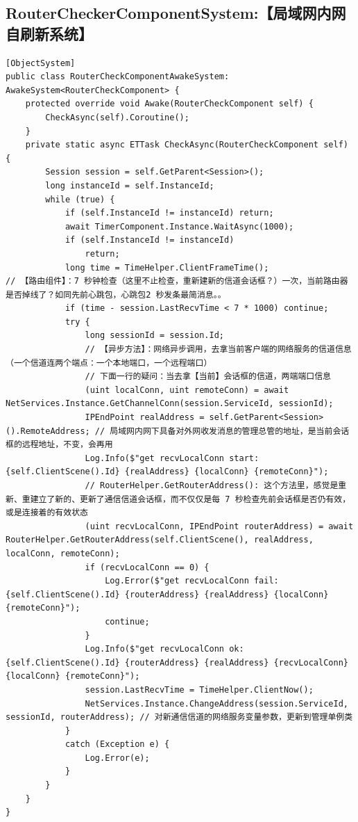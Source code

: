 \documentclass[9pt, b5paper]{article}
\begin{document}
\subsection{RouterCheckerComponentSystem:【局域网内网自刷新系统】}
\label{sec-7-19}
\begin{verbatim}
[ObjectSystem]
public class RouterCheckComponentAwakeSystem: AwakeSystem<RouterCheckComponent> {
    protected override void Awake(RouterCheckComponent self) {
        CheckAsync(self).Coroutine();
    }
    private static async ETTask CheckAsync(RouterCheckComponent self) {
        Session session = self.GetParent<Session>();
        long instanceId = self.InstanceId;
        while (true) {
            if (self.InstanceId != instanceId) return;
            await TimerComponent.Instance.WaitAsync(1000);
            if (self.InstanceId != instanceId) 
                return;
            long time = TimeHelper.ClientFrameTime();
// 【路由组件】：7 秒钟检查（这里不止检查，重新建新的信道会话框？）一次，当前路由器是否掉线了？如同先前心跳包，心跳包2 秒发条最简消息。。
            if (time - session.LastRecvTime < 7 * 1000) continue;
            try {
                long sessionId = session.Id;
                // 【异步方法】：网络异步调用，去拿当前客户端的网络服务的信道信息（一个信道连两个端点：一个本地端口，一个远程端口）
                // 下面一行的疑问：当去拿【当前】会话框的信道，两端端口信息
                (uint localConn, uint remoteConn) = await NetServices.Instance.GetChannelConn(session.ServiceId, sessionId);
                IPEndPoint realAddress = self.GetParent<Session>().RemoteAddress; // 局域网内网下具备对外网收发消息的管理总管的地址，是当前会话框的远程地址，不变，会再用
                Log.Info($"get recvLocalConn start: {self.ClientScene().Id} {realAddress} {localConn} {remoteConn}");
                // RouterHelper.GetRouterAddress(): 这个方法里，感觉是重新、重建立了新的、更新了通信信道会话框，而不仅仅是每 7 秒检查先前会话框是否仍有效，或是连接着的有效状态 
                (uint recvLocalConn, IPEndPoint routerAddress) = await RouterHelper.GetRouterAddress(self.ClientScene(), realAddress, localConn, remoteConn);
                if (recvLocalConn == 0) {
                    Log.Error($"get recvLocalConn fail: {self.ClientScene().Id} {routerAddress} {realAddress} {localConn} {remoteConn}");
                    continue;
                }
                Log.Info($"get recvLocalConn ok: {self.ClientScene().Id} {routerAddress} {realAddress} {recvLocalConn} {localConn} {remoteConn}");
                session.LastRecvTime = TimeHelper.ClientNow();
                NetServices.Instance.ChangeAddress(session.ServiceId, sessionId, routerAddress); // 对新通信信道的网络服务变量参数，更新到管理单例类
            }
            catch (Exception e) {
                Log.Error(e);
            }
        }
    }
}
\end{verbatim}
\end{document}
